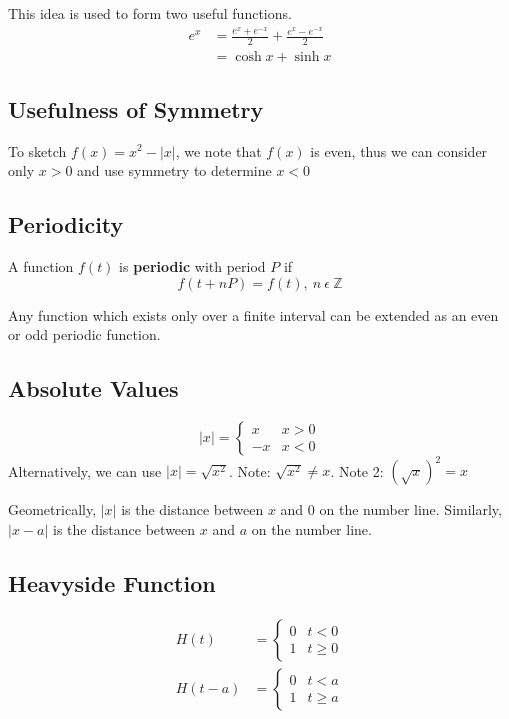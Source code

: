 \documentclass[12pt]{article}
\begin{document}
This idea is used to form two useful functions.
\begin{align*}
e^x &= \frac{e^x + e^{-x}}{2} + \frac{e^x-e^{-x}}{2}\\
&= \cosh{x} + \sinh{x}
\end{align*}

\subsection*{Usefulness of Symmetry}
To sketch $f(x) = x^2 - |x|$, we note that $f(x)$ is even, thus we can consider only $x > 0$ and use symmetry to determine $x < 0$

\subsection*{Periodicity}
A function $f(t)$ is {\bf periodic} with period $P$ if \[ f(t + nP) = f(t),\ n\ \epsilon\ \mathbb{Z} \]

Any function which exists only over a finite interval can be extended as an even or odd periodic function.

\subsection*{Absolute Values}
\[ |x| =
    \begin{cases}
    x & x > 0\\
    -x & x < 0
    \end{cases}
\]
Alternatively, we can use $|x| = \sqrt{x^2}$. Note: $\sqrt{x^2}\neq x$. Note 2: $(\sqrt{x})^2 = x$

Geometrically, $|x|$ is the distance between $x$ and $0$ on the number line. Similarly, $|x-a|$ is the distance between $x$ and $a$ on the number line.

\subsection*{Heavyside Function}
\begin{align*}
H(t) &= \begin{cases}0 & t < 0\\ 1 & t \geq 0\end{cases}\\
H(t-a) &= \begin{cases}0 & t < a\\ 1 & t \geq a\end{cases}
\end{align*}
\end{document}
